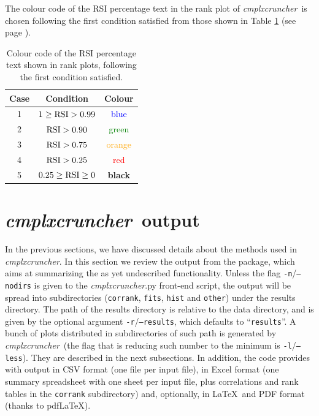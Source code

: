\documentclass[12pt,oneside,letterpaper]{article}
\newcommand{\CC}[0]{\emph{cmplxcruncher}}
\begin{document}
The colour code of the RSI percentage text in the rank plot of \CC\ is chosen following the first condition satisfied from those shown in Table \ref{tab:RSI} (see page \pageref{tab:RSI}). 

\begin{table}
  \begin{center}
    \begin{tabular}{ccc}
    \hline
    Case  &  Condition  &  Colour  \\
    \hline
    1  &  $1\ge{\rm RSI}>0.99$  & \textcolor{blue}{blue}  \\ 
    2  & ${\rm RSI}>0.90$  &  \textcolor{green}{green}  \\
    3  &  ${\rm RSI}>0.75$  &  \textcolor{orange}{orange} \\
    4  &  ${\rm RSI}>0.25$  &  \textcolor{red}{red} \\
    5  &  $0.25\ge{\rm RSI}\ge0$  &  \bfseries{black}  \\
    \hline
    \end{tabular}
  \end{center}
  \caption{Colour code of the RSI percentage text shown in rank plots, following the first condition satisfied.}
  \label{tab:RSI}
\end{table}

\section{\CC\ output}
In the previous sections, we have discussed details about the methods used in \CC. In this section we review the output from the package, which aims at summarizing the as yet undescribed functionality. Unless the flag \texttt{-n}/\texttt{--nodirs} is given to the \CC.py front-end script, the output will be spread into subdirectories (\texttt{corrank}, \texttt{fits}, \texttt{hist} and \texttt{other}) under the results directory. The path of the results directory is relative to the data directory, and is given by the optional argument \texttt{-r}/\texttt{--results}, which defaults to ``\texttt{results}''. A bunch of plots distributed in subdirectories of such path is generated by \CC\ (the flag that is reducing such number to the minimum is \texttt{-l}/\texttt{--less}). They are described in the next subsections. In addition, the code provides with output in CSV format (one file per input file), in Excel format (one summary spreadsheet with one sheet per input file, plus correlations and rank tables in the \texttt{corrank} subdirectory) and, optionally, in \LaTeX\ and PDF format (thanks to pdf\LaTeX).
\end{document}
